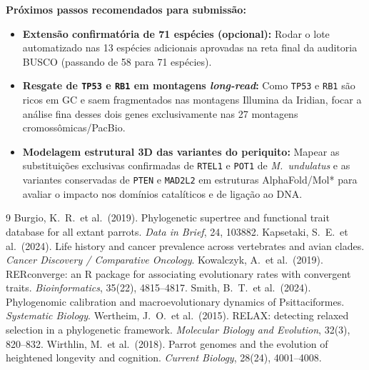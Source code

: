 \documentclass[10pt,a4paper,twocolumn]{article}
\begin{document}
\noindent\textbf{Próximos passos recomendados para submissão:}
\begin{itemize}
    \item \textbf{Extensão confirmatória de 71 espécies (opcional):} Rodar o lote automatizado nas 13 espécies adicionais aprovadas na reta final da auditoria BUSCO (passando de 58 para 71 espécies).
    \item \textbf{Resgate de \texttt{TP53} e \texttt{RB1} em montagens \textit{long-read}:} Como \texttt{TP53} e \texttt{RB1} são ricos em GC e saem fragmentados nas montagens Illumina da Iridian, focar a análise fina desses dois genes exclusivamente nas 27 montagens cromossômicas/PacBio.
    \item \textbf{Modelagem estrutural 3D das variantes do periquito:} Mapear as substituições exclusivas confirmadas de \texttt{RTEL1} e \texttt{POT1} de \textit{M.\ undulatus} e as variantes conservadas de \texttt{PTEN} e \texttt{MAD2L2} em estruturas AlphaFold/Mol* para avaliar o impacto nos domínios catalíticos e de ligação ao DNA.
\end{itemize}

\begin{thebibliography}{9}
\footnotesize
{} Burgio, K.\ R.\ et al.\ (2019). Phylogenetic supertree and functional trait database for all extant parrots. \textit{Data in Brief}, 24, 103882.
 Kapsetaki, S.\ E.\ et al.\ (2024). Life history and cancer prevalence across vertebrates and avian clades. \textit{Cancer Discovery / Comparative Oncology}.
 Kowalczyk, A.\ et al.\ (2019). RERconverge: an R package for associating evolutionary rates with convergent traits. \textit{Bioinformatics}, 35(22), 4815--4817.
 Smith, B.\ T.\ et al.\ (2024). Phylogenomic calibration and macroevolutionary dynamics of Psittaciformes. \textit{Systematic Biology}.
 Wertheim, J.\ O.\ et al.\ (2015). RELAX: detecting relaxed selection in a phylogenetic framework. \textit{Molecular Biology and Evolution}, 32(3), 820--832.
 Wirthlin, M.\ et al.\ (2018). Parrot genomes and the evolution of heightened longevity and cognition. \textit{Current Biology}, 28(24), 4001--4008.
\end{thebibliography}
\end{document}
